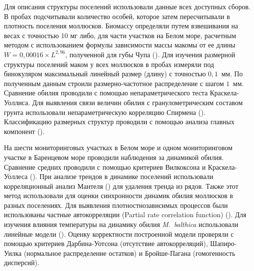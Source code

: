 Для описания структуры поселений использовали данные всех доступных сборов.
В пробах подсчитывали количество особей, которое затем пересчитывали в плотность поселения моллюсков. 
Биомассу определяли путем взвешивания на весах с точностью 10 мг либо, для части участков на Белом море, расчетным методом с использованием формулы зависимости массы макомы от ее длины $W = 0,00016 \times L^{2,96}$, полученной для губы Чупа (\cite{Maximovich_et_al_1993}).
Для изучения размерной структуры поселений маком у всех моллюсков в пробах измеряли под бинокуляром максимальный линейный размер (длину) с точностью $0,1$~мм.
По полученным данным строили размерно-частотное распределение с шагом $1$~мм.
Сравнение обилия проводили с помощью непараметрического теста Краскела-Уоллиса. 
Для выявления связи величин обилия с гранулометрическим составом грунта использовали непараметрическую корреляцию Спирмена (\cite{Hollander_et_al_2013}).
Классификацию размерных структур проводили с помощью анализа главных компонент (\cite{Mardia_et_al_1979}).

На шести мониторинговых участках в Белом море и одном мониторинговом участке в Баренцевом море проводили наблюдения за динамикой обилия.
Сравнение средних проводили с помощью критериев Вилкоксона и Краскела-Уоллеса (\cite{Hollander_et_al_2013}).
При анализе трендов в динамике поселений использовали корреляционный анализ Мантеля (\cite{Legendre_Legendre_2012}) для удаления тренда из рядов. 
Также этот метод использовали для оценки синхронности динамик обилия моллюсков в разных поселениях.
Для выявления плотностнозависимых процессов были использованы частные автокорреляции (Partial rate correlation function) (\cite{Berryman_Turchin_2001}).
Для изучения влияния температуры на динамику обилия \textit{M.~balthica} использовали линейные модели (\cite{Chambers_Hastie_1991}).
Оценку корректности построенной модели проверяли с помощью критериев Дарбина-Уотсона (отсутствие автокорреляций), Шапиро-Уилка (нормальное распределение остатков) и Бройше-Пагана (гомогенность дисперсий).

